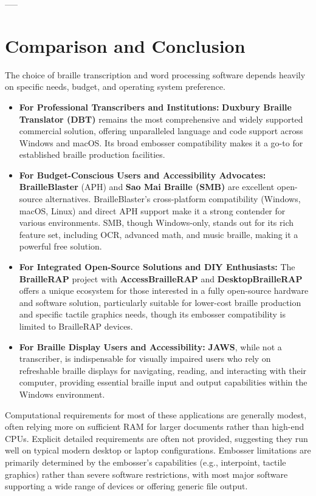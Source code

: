 -----

\section{Comparison and Conclusion}
The choice of braille transcription and word processing software depends heavily on specific needs, budget, and operating system preference.

\begin{itemize}
\item \textbf{For Professional Transcribers and Institutions:} \textbf{Duxbury Braille Translator (DBT)} remains the most comprehensive and widely supported commercial solution, offering unparalleled language and code support across Windows and macOS. Its broad embosser compatibility makes it a go-to for established braille production facilities.
\item \textbf{For Budget-Conscious Users and Accessibility Advocates:} \textbf{BrailleBlaster} (APH) and \textbf{Sao Mai Braille (SMB)} are excellent open-source alternatives. BrailleBlaster's cross-platform compatibility (Windows, macOS, Linux) and direct APH support make it a strong contender for various environments. SMB, though Windows-only, stands out for its rich feature set, including OCR, advanced math, and music braille, making it a powerful free solution.
\item \textbf{For Integrated Open-Source Solutions and DIY Enthusiasts:} The \textbf{BrailleRAP} project with \textbf{AccessBrailleRAP} and \textbf{DesktopBrailleRAP} offers a unique ecosystem for those interested in a fully open-source hardware and software solution, particularly suitable for lower-cost braille production and specific tactile graphics needs, though its embosser compatibility is limited to BrailleRAP devices.
\item \textbf{For Braille Display Users and Accessibility:} \textbf{JAWS}, while not a transcriber, is indispensable for visually impaired users who rely on refreshable braille displays for navigating, reading, and interacting with their computer, providing essential braille input and output capabilities within the Windows environment.
\end{itemize}

Computational requirements for most of these applications are generally modest, often relying more on sufficient RAM for larger documents rather than high-end CPUs. Explicit detailed requirements are often not provided, suggesting they run well on typical modern desktop or laptop configurations. Embosser limitations are primarily determined by the embosser's capabilities (e.g., interpoint, tactile graphics) rather than severe software restrictions, with most major software supporting a wide range of devices or offering generic file output.

